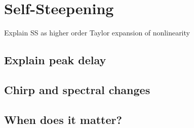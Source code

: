 \chapter{Self-Steepening}
\label{ch:SS}

Explain SS as higher order Taylor expansion of nonlinearity

\section{Explain peak delay}

\section{Chirp and spectral changes}

\section{When does it matter?}
 
 